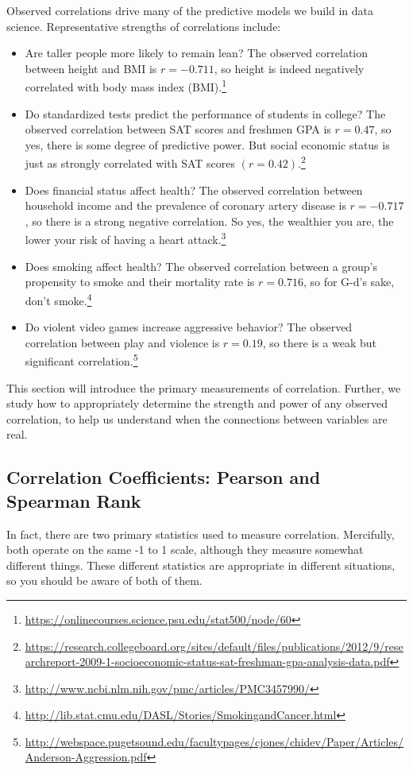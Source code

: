 \documentclass[10pt]{article}
\begin{document}
Observed correlations drive many of the predictive models we build in data science. Representative strengths of correlations include:
\begin{itemize}
    \item Are taller people more likely to remain lean? The observed correlation between height and BMI is \(r=-0.711\), so height is indeed negatively correlated with body mass index (BMI).\footnote{\url{https://onlinecourses.science.psu.edu/stat500/node/60}}
    \item Do standardized tests predict the performance of students in college? The observed correlation between SAT scores and freshmen GPA is \(r=0.47\), so yes, there is some degree of predictive power. But social economic status is just as strongly correlated with SAT scores \((r=0.42)\).\footnote{\url{https://research.collegeboard.org/sites/default/files/publications/2012/9/researchreport-2009-1-socioeconomic-status-sat-freshman-gpa-analysis-data.pdf}}
    \item Does financial status affect health? The observed correlation between household income and the prevalence of coronary artery disease is \(r= -0.717\), so there is a strong negative correlation. So yes, the wealthier you are, the lower your risk of having a heart attack.\footnote{\url{http://www.ncbi.nlm.nih.gov/pmc/articles/PMC3457990/}}
    \item Does smoking affect health? The observed correlation between a group's propensity to smoke and their mortality rate is \(r=0.716\), so for G-d's sake, don't smoke.\footnote{\url{http://lib.stat.cmu.edu/DASL/Stories/SmokingandCancer.html}}
    \item Do violent video games increase aggressive behavior? The observed correlation between play and violence is \(r=0.19\), so there is a weak but significant correlation.\footnote{\url{http://webspace.pugetsound.edu/facultypages/cjones/chidev/Paper/Articles/Anderson-Aggression.pdf}}
\end{itemize}

This section will introduce the primary measurements of correlation. Further, we study how to appropriately determine the strength and power of any observed correlation, to help us understand when the connections between variables are real.

\subsection{Correlation Coefficients: Pearson and Spearman Rank}
In fact, there are two primary statistics used to measure correlation. Mercifully, both operate on the same -1 to 1 scale, although they measure somewhat different things. These different statistics are appropriate in different situations, so you should be aware of both of them.
\end{document}
